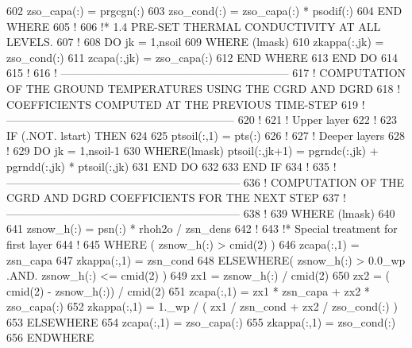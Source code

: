 \begin{DoxyCode}
602     zso\_capa(:) = prgcgn(:)
603     zso\_cond(:) = zso\_capa(:) * psodif(:)
604 \textcolor{keywordflow}{  END WHERE}
605 \textcolor{comment}{!}
606 \textcolor{comment}{!*    1.4 PRE-SET THERMAL CONDUCTIVITY AT ALL LEVELS.}
607 \textcolor{comment}{!}
608   \textcolor{keywordflow}{DO} jk = 1,nsoil
609     \textcolor{keywordflow}{WHERE} (lmask)
610       zkappa(:,jk) = zso\_cond(:)
611       zcapa(:,jk)  = zso\_capa(:)
612 \textcolor{keywordflow}{    END WHERE}
613 \textcolor{keywordflow}{  END DO}
614 
615 \textcolor{comment}{!}
616 \textcolor{comment}{!   --------------------------------------------------------------}
617 \textcolor{comment}{!   COMPUTATION OF THE GROUND TEMPERATURES USING THE CGRD AND DGRD}
618 \textcolor{comment}{!   COEFFICIENTS COMPUTED AT THE PREVIOUS TIME-STEP}
619 \textcolor{comment}{!   --------------------------------------------------------------}
620 \textcolor{comment}{!}
621 \textcolor{comment}{!   Upper layer}
622 \textcolor{comment}{!}
623   \textcolor{keywordflow}{IF} (.NOT. lstart) \textcolor{keywordflow}{THEN}
624 
625     ptsoil(:,1) = pts(:)
626 \textcolor{comment}{!}
627 \textcolor{comment}{!   Deeper layers}
628 \textcolor{comment}{!}
629     \textcolor{keywordflow}{DO} jk = 1,nsoil-1
630       \textcolor{keywordflow}{WHERE}(lmask) ptsoil(:,jk+1) = pgrndc(:,jk) + pgrndd(:,jk) * ptsoil(:,jk)
631 \textcolor{keywordflow}{    END DO}
632 
633 \textcolor{keywordflow}{  END IF}
634 \textcolor{comment}{!}
635 \textcolor{comment}{!   ---------------------------------------------------------------}
636 \textcolor{comment}{!   COMPUTATION OF THE CGRD AND DGRD COEFFICIENTS FOR THE NEXT STEP}
637 \textcolor{comment}{!   ---------------------------------------------------------------}
638 \textcolor{comment}{!}
639   \textcolor{keywordflow}{WHERE} (lmask)
640 
641     zsnow\_h(:) = psn(:) * rhoh2o / zsn\_dens
642 \textcolor{comment}{!}
643 \textcolor{comment}{!*       Special treatment for first layer}
644 \textcolor{comment}{!}
645     \textcolor{keywordflow}{WHERE} ( zsnow\_h(:) > cmid(2) )
646       zcapa(:,1) = zsn\_capa
647       zkappa(:,1) = zsn\_cond
648     \textcolor{keywordflow}{ELSEWHERE}( zsnow\_h(:) > 0.0\_wp .AND. zsnow\_h(:) <= cmid(2) )
649       zx1 = zsnow\_h(:) / cmid(2)
650       zx2 = ( cmid(2) - zsnow\_h(:)) / cmid(2)
651       zcapa(:,1) = zx1 * zsn\_capa + zx2 * zso\_capa(:)
652       zkappa(:,1) = 1.\_wp / ( zx1 / zsn\_cond + zx2 / zso\_cond(:) )
653     \textcolor{keywordflow}{ELSEWHERE}
654       zcapa(:,1) = zso\_capa(:)
655       zkappa(:,1) = zso\_cond(:)
656 \textcolor{keywordflow}{    ENDWHERE}

\end{DoxyCode}
